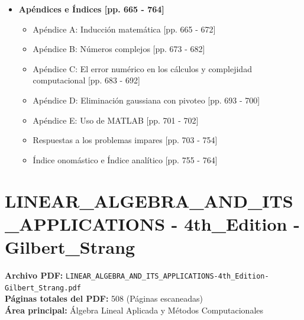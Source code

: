 \documentclass[11pt,a4paper]{article}
\begin{document}
\begin{itemize}
    \item \textbf{Apéndices e Índices [pp. 665 - 764]}
    \begin{itemize}
        \item Apéndice A: Inducción matemática [pp. 665 - 672]
        \item Apéndice B: Números complejos [pp. 673 - 682]
        \item Apéndice C: El error numérico en los cálculos y complejidad computacional [pp. 683 - 692]
        \item Apéndice D: Eliminación gaussiana con pivoteo [pp. 693 - 700]
        \item Apéndice E: Uso de MATLAB [pp. 701 - 702]
        \item Respuestas a los problemas impares [pp. 703 - 754]
        \item Índice onomástico e Índice analítico [pp. 755 - 764]
    \end{itemize}
\end{itemize}

\newpage

\section{LINEAR\_ALGEBRA\_AND\_ITS\_APPLICATIONS - 4th\_Edition - Gilbert\_Strang}
\textbf{Archivo PDF:} \texttt{LINEAR\_ALGEBRA\_AND\_ITS\_APPLICATIONS-4th\_Edition-Gilbert\_Strang.pdf} \\
\textbf{Páginas totales del PDF:} 508 (Páginas escaneadas) \\
\textbf{Área principal:} Álgebra Lineal Aplicada y Métodos Computacionales
\end{document}

